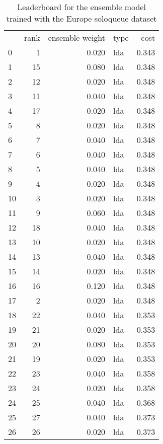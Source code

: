 \begin{table}[]
	\centering
	\begin{tabular}{lrrlr}
		   & rank & ensemble-weight & type & cost  \\
		0  & 1    & 0.020           & lda  & 0.343 \\
		1  & 15   & 0.080           & lda  & 0.348 \\
		2  & 12   & 0.020           & lda  & 0.348 \\
		3  & 11   & 0.040           & lda  & 0.348 \\
		4  & 17   & 0.020           & lda  & 0.348 \\
		5  & 8    & 0.020           & lda  & 0.348 \\
		6  & 7    & 0.040           & lda  & 0.348 \\
		7  & 6    & 0.040           & lda  & 0.348 \\
		8  & 5    & 0.040           & lda  & 0.348 \\
		9  & 4    & 0.020           & lda  & 0.348 \\
		10 & 3    & 0.020           & lda  & 0.348 \\
		11 & 9    & 0.060           & lda  & 0.348 \\
		12 & 18   & 0.040           & lda  & 0.348 \\
		13 & 10   & 0.020           & lda  & 0.348 \\
		14 & 13   & 0.040           & lda  & 0.348 \\
		15 & 14   & 0.020           & lda  & 0.348 \\
		16 & 16   & 0.120           & lda  & 0.348 \\
		17 & 2    & 0.020           & lda  & 0.348 \\
		18 & 22   & 0.040           & lda  & 0.353 \\
		19 & 21   & 0.020           & lda  & 0.353 \\
		20 & 20   & 0.080           & lda  & 0.353 \\
		21 & 19   & 0.020           & lda  & 0.353 \\
		22 & 23   & 0.040           & lda  & 0.358 \\
		23 & 24   & 0.020           & lda  & 0.358 \\
		24 & 25   & 0.040           & lda  & 0.368 \\
		25 & 27   & 0.040           & lda  & 0.373 \\
		26 & 26   & 0.020           & lda  & 0.373 \\
	\end{tabular}

	\caption{Leaderboard for the ensemble model trained with the Europe soloqueue dataset}
	\label{tab:lb-europe-games-full}
\end{table}

